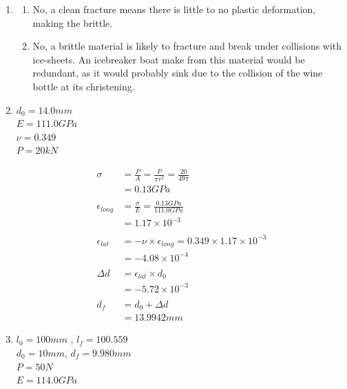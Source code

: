 \documentclass[a4paper,11pt]{article}
\begin{document}
\begin{enumerate}
    \item 

    \begin{enumerate}
        \item No, a clean fracture means there is little to no plastic deformation, making the brittle.

        \item No, a brittle material is likely to fracture and break under collisions with ice-sheets. An icebreaker boat make from this material would be redundant, as it would probably sink due to the collision of the wine bottle at its christening.  
    \end{enumerate}

    \newpage

    \item 
    $d_0 = 14.0mm$\\
    $E = 111.0GPa$\\
    $\nu = 0.349$\\
    $P = 20kN$

    \begin{align*}
        \sigma &= \frac{P}{A} = \frac{P}{\pi r^2} = \frac{20}{49 \pi }\\
        &= 0.13 GPa\\\\
        \epsilon_{long} &= \frac{\sigma}{E} = \frac{0.13GPa}{111.0GPa}\\
        &= 1.17\times10^{-3}\\\\
        \epsilon_{lat} &= -\nu \times \epsilon_{long} = 0.349 \times 1.17\times10^{-3}\\
        &= -4.08\times10^{-4}\\\\
        \Delta d &=  \epsilon_{lat} \times d_0 \\
        &= -5.72\times10^{-3}\\\\
        d_f &= d_0 + \Delta d\\
        &= 13.9942mm
    \end{align*}

    \item 
    $l_0 = 100mm$ , $l_f = 100.559$\\
    $d_0 = 10mm$, $d_f = 9.980mm$\\
    $P = 50N$\\
    $E = 114.0GPa$\\


\end{enumerate}
\end{document}
